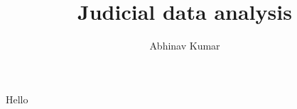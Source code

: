 \documentclass{report}
\title{Judicial data analysis}
\author{Abhinav Kumar}
\begin{document}
\maketitle
Hello
\end{document}
